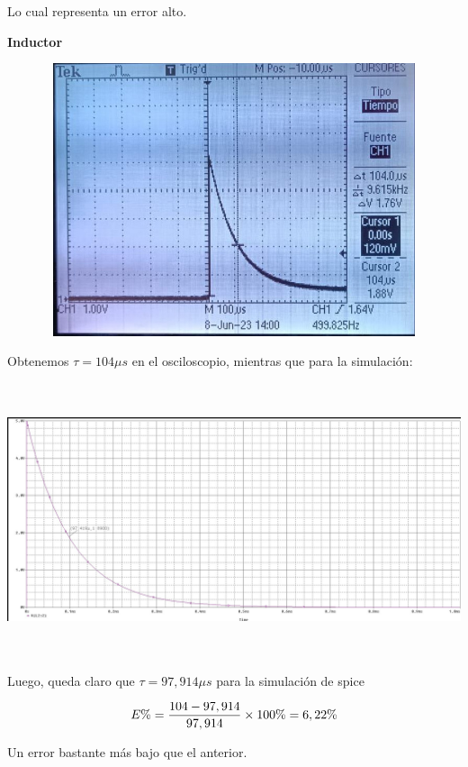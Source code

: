 \documentclass[12pt]{article}
\begin{document}
\begin{enumerate}
		\noindent Lo cual representa un error alto.
		
		\noindent \textbf{Inductor}
		
		\begin{center}
			\includegraphics[width=16cm,height=8cm]{Img/inductor}
		\end{center}
		
		\noindent Obtenemos $\tau = 104 \mu s$ en el osciloscopio, mientras que para la simulación:
		
		\begin{center}
			\includegraphics[width=16cm,height=8cm]{Img/inductor_spice}
		\end{center}
		
		\noindent Luego, queda claro que $\tau = 97,914 \mu s$ para la simulación de spice
		
		\begin{equation}
			\notag E\% = \frac{104 - 97,914}{97,914}\times 100\% = 6,22\%
		\end{equation}
		
		\noindent Un error bastante más bajo que el anterior.
		
	\end{enumerate}
	
\end{document}
